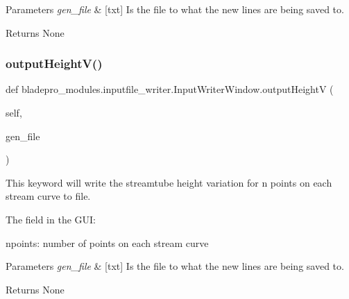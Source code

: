 \begin{DoxyParams}{Parameters}
{\em gen\+\_\+file} & \mbox{[}txt\mbox{]} Is the file to what the new lines are being saved to. \\
\hline
\end{DoxyParams}
\begin{DoxyReturn}{Returns}
None 
\end{DoxyReturn}
\hypertarget{a00073_a15fdf4aaecf99b885796124500f80114}{}\label{a00073_a15fdf4aaecf99b885796124500f80114} 
\subsubsection{\texorpdfstring{output\+Height\+V()}{outputHeightV()}}
{\footnotesize\ttfamily def bladepro\+\_\+modules.\+inputfile\+\_\+writer.\+Input\+Writer\+Window.\+output\+HeightV (\begin{DoxyParamCaption}\item[{}]{self,  }\item[{}]{gen\+\_\+file }\end{DoxyParamCaption})}



This keyword will write the streamtube height variation for n points on each stream curve to file. 

The field in the G\+UI\+: \begin{DoxyItemize}
\item {\ttfamily npoints\+:} number of points on each stream curve\end{DoxyItemize}

\begin{DoxyParams}{Parameters}
{\em gen\+\_\+file} & \mbox{[}txt\mbox{]} Is the file to what the new lines are being saved to. \\
\hline
\end{DoxyParams}
\begin{DoxyReturn}{Returns}
None 
\end{DoxyReturn}
\hypertarget{a00073_a8e556016279f9aabdabb9b6f708c95cb}{}\label{a00073_a8e556016279f9aabdabb9b6f708c95cb} 
